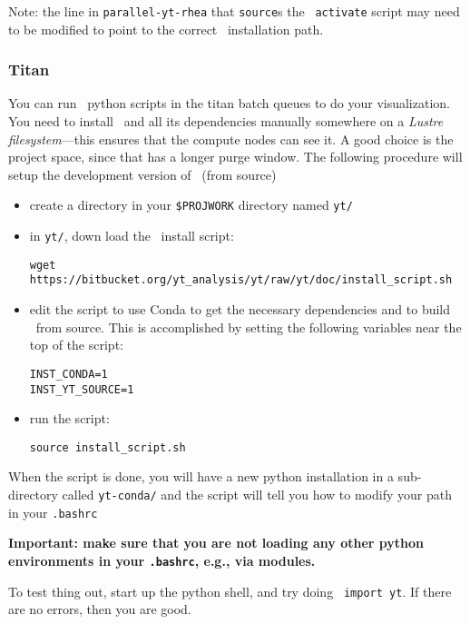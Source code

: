 Note: the line in {\tt parallel-yt-rhea} that {\tt source}s the \yt\
{\tt activate} script may need to be modified to point to the
correct \yt\ installation path.


\subsubsection{Titan}

You can run \yt\ python scripts in the titan batch queues to do your
visualization.  You need to install \yt\ and all its dependencies
manually somewhere on a {\em Lustre filesystem}---this ensures that the
compute nodes can see it.  A good choice is the project space, since
that has a longer purge window.  The following procedure will setup
the development version of \yt\ (from source)
\begin{itemize}
\item create a directory in your {\tt \$PROJWORK} directory named {\tt yt/}

\item in {\tt yt/}, down load the \yt\ install script:
\begin{verbatim}
wget https://bitbucket.org/yt_analysis/yt/raw/yt/doc/install_script.sh
\end{verbatim}

\item edit the script to use Conda to get the necessary dependencies
and to build \yt\ from source.  This is accomplished by setting the 
following variables near the top of the script:
\begin{verbatim}
INST_CONDA=1
INST_YT_SOURCE=1
\end{verbatim}

\item run the script:
\begin{verbatim}
source install_script.sh
\end{verbatim}
\end{itemize}

When the script is done, you will have a new python installation in a sub-directory
called {\tt yt-conda/} and the script will tell you how to modify your path
in your {\tt .bashrc}

{\bfseries Important: make sure that you are not loading any other
  python environments in your {\tt .bashrc}, e.g., via modules.}

To test thing out, start up the python shell, and try doing {\tt
  import yt}.  If there are no errors, then you are good.


